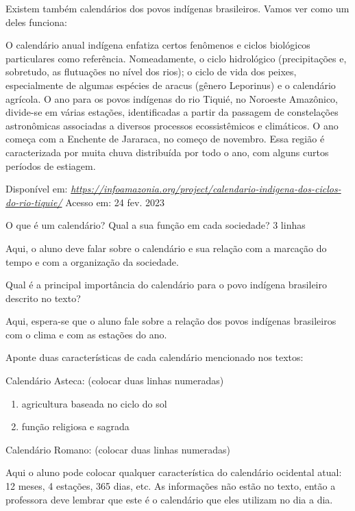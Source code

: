 Existem também calendários dos povos indígenas brasileiros. Vamos ver
como um deles funciona:

O calendário anual indígena enfatiza certos fenômenos e ciclos
biológicos particulares como referência. Nomeadamente, o ciclo
hidrológico (precipitações e, sobretudo, as flutuações no nível dos
rios); o ciclo de vida dos peixes, especialmente de algumas espécies de
aracus (gênero Leporinus) e o calendário agrícola. O ano para os povos
indígenas do rio Tiquié, no Noroeste Amazônico, divide-se em várias
estações, identificadas a partir da passagem de constelações
astronômicas associadas a diversos processos ecossistêmicos e
climáticos. O ano começa com a Enchente de Jararaca, no começo de
novembro. Essa região é caracterizada por muita chuva distribuída por
todo o ano, com alguns curtos períodos de estiagem.

Disponível em:
\href{https://infoamazonia.org/project/calendario-indigena-dos-ciclos-do-rio-tiquie/}{\emph{https://infoamazonia.org/project/calendario-indigena-dos-ciclos-do-rio-tiquie/}}
Acesso em: 24 fev. 2023

O que é um calendário? Qual a sua função em cada sociedade? 3 linhas

Aqui, o aluno deve falar sobre o calendário e sua relação com a marcação
do tempo e com a organização da sociedade.

Qual é a principal importância do calendário para o povo indígena
brasileiro descrito no texto?

Aqui, espera-se que o aluno fale sobre a relação dos povos indígenas
brasileiros com o clima e com as estações do ano.

Aponte duas características de cada calendário mencionado nos textos:

Calendário Asteca: (colocar duas linhas numeradas)

\begin{enumerate}
\def\labelenumi{\arabic{enumi}.}
\item
  agricultura baseada no ciclo do sol
\item
  função religiosa e sagrada
\end{enumerate}

Calendário Romano: (colocar duas linhas numeradas)

Aqui o aluno pode colocar qualquer característica do calendário
ocidental atual: 12 meses, 4 estações, 365 dias, etc. As informações não
estão no texto, então a professora deve lembrar que este é o calendário
que eles utilizam no dia a dia.

